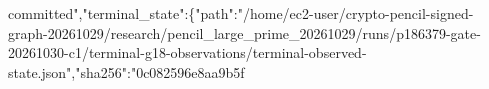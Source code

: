 \documentclass[10pt]{article}
\begin{document}
\allowbreak{}c\allowbreak{}o\allowbreak{}m\allowbreak{}m\allowbreak{}i\allowbreak{}t\allowbreak{}t\allowbreak{}e\allowbreak{}d\allowbreak{}"\allowbreak{},\allowbreak{}"\allowbreak{}t\allowbreak{}e\allowbreak{}r\allowbreak{}m\allowbreak{}i\allowbreak{}n\allowbreak{}a\allowbreak{}l\allowbreak{}\_\allowbreak{}s\allowbreak{}t\allowbreak{}a\allowbreak{}t\allowbreak{}e\allowbreak{}"\allowbreak{}:\allowbreak{}\{\allowbreak{}"\allowbreak{}p\allowbreak{}a\allowbreak{}t\allowbreak{}h\allowbreak{}"\allowbreak{}:\allowbreak{}"\allowbreak{}/\allowbreak{}h\allowbreak{}o\allowbreak{}m\allowbreak{}e\allowbreak{}/\allowbreak{}e\allowbreak{}c\allowbreak{}2\allowbreak{}-\allowbreak{}u\allowbreak{}s\allowbreak{}e\allowbreak{}r\allowbreak{}/\allowbreak{}c\allowbreak{}r\allowbreak{}y\allowbreak{}p\allowbreak{}t\allowbreak{}o\allowbreak{}-\allowbreak{}p\allowbreak{}e\allowbreak{}n\allowbreak{}c\allowbreak{}i\allowbreak{}l\allowbreak{}-\allowbreak{}s\allowbreak{}i\allowbreak{}g\allowbreak{}n\allowbreak{}e\allowbreak{}d\allowbreak{}-\allowbreak{}g\allowbreak{}r\allowbreak{}a\allowbreak{}p\allowbreak{}h\allowbreak{}-\allowbreak{}2\allowbreak{}0\allowbreak{}2\allowbreak{}6\allowbreak{}1\allowbreak{}0\allowbreak{}2\allowbreak{}9\allowbreak{}/\allowbreak{}r\allowbreak{}e\allowbreak{}s\allowbreak{}e\allowbreak{}a\allowbreak{}r\allowbreak{}c\allowbreak{}h\allowbreak{}/\allowbreak{}p\allowbreak{}e\allowbreak{}n\allowbreak{}c\allowbreak{}i\allowbreak{}l\allowbreak{}\_\allowbreak{}l\allowbreak{}a\allowbreak{}r\allowbreak{}g\allowbreak{}e\allowbreak{}\_\allowbreak{}p\allowbreak{}r\allowbreak{}i\allowbreak{}m\allowbreak{}e\allowbreak{}\_\allowbreak{}2\allowbreak{}0\allowbreak{}2\allowbreak{}6\allowbreak{}1\allowbreak{}0\allowbreak{}2\allowbreak{}9\allowbreak{}/\allowbreak{}r\allowbreak{}u\allowbreak{}n\allowbreak{}s\allowbreak{}/\allowbreak{}p\allowbreak{}1\allowbreak{}8\allowbreak{}6\allowbreak{}3\allowbreak{}7\allowbreak{}9\allowbreak{}-\allowbreak{}g\allowbreak{}a\allowbreak{}t\allowbreak{}e\allowbreak{}-\allowbreak{}2\allowbreak{}0\allowbreak{}2\allowbreak{}6\allowbreak{}1\allowbreak{}0\allowbreak{}3\allowbreak{}0\allowbreak{}-\allowbreak{}c\allowbreak{}1\allowbreak{}/\allowbreak{}t\allowbreak{}e\allowbreak{}r\allowbreak{}m\allowbreak{}i\allowbreak{}n\allowbreak{}a\allowbreak{}l\allowbreak{}-\allowbreak{}g\allowbreak{}1\allowbreak{}8\allowbreak{}-\allowbreak{}o\allowbreak{}b\allowbreak{}s\allowbreak{}e\allowbreak{}r\allowbreak{}v\allowbreak{}a\allowbreak{}t\allowbreak{}i\allowbreak{}o\allowbreak{}n\allowbreak{}s\allowbreak{}/\allowbreak{}t\allowbreak{}e\allowbreak{}r\allowbreak{}m\allowbreak{}i\allowbreak{}n\allowbreak{}a\allowbreak{}l\allowbreak{}-\allowbreak{}o\allowbreak{}b\allowbreak{}s\allowbreak{}e\allowbreak{}r\allowbreak{}v\allowbreak{}e\allowbreak{}d\allowbreak{}-\allowbreak{}s\allowbreak{}t\allowbreak{}a\allowbreak{}t\allowbreak{}e\allowbreak{}.\allowbreak{}j\allowbreak{}s\allowbreak{}o\allowbreak{}n\allowbreak{}"\allowbreak{},\allowbreak{}"\allowbreak{}s\allowbreak{}h\allowbreak{}a\allowbreak{}2\allowbreak{}5\allowbreak{}6\allowbreak{}"\allowbreak{}:\allowbreak{}"\allowbreak{}0\allowbreak{}c\allowbreak{}0\allowbreak{}8\allowbreak{}2\allowbreak{}5\allowbreak{}9\allowbreak{}6\allowbreak{}e\allowbreak{}8\allowbreak{}a\allowbreak{}a\allowbreak{}9\allowbreak{}b\allowbreak{}5\allowbreak{}f\allowbreak{}
\end{document}
